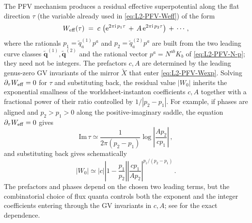 The PFV mechanism produces a residual effective superpotential along
the flat direction $\tau$ (the variable already used in
\eqref{eq:L2-PFV-Weff}) of the form
\begin{equation}\label{eq:racetrack}
    W_{\rm eff}(\tau) \;=\; c\,\left (\mathrm{e}^{2\pi\mathrm{i}\,p_1 \tau}
        \,+\, A\,\mathrm{e}^{2\pi\mathrm{i}\,p_2 \tau}\right )
        \,+\, \cdots \,,
\end{equation}
where the rationals $p_1=\widetilde q^{(1)}_a p^a$ and
$p_2=\widetilde q^{(2)}_a p^a$ are built from the two leading curve
classes $\widetilde{\mathbf q}^{(1)},\widetilde{\mathbf q}^{(2)}$
and the rational vector $p^a=N^{ab}K_b$ of
\eqref{eq:L2-PFV-N-p}; they need not be integers.  The
prefactors $c, A$ are determined by the leading genus-zero
GV invariants of the mirror $\widetilde X$ that enter
\eqref{eq:L2-PFV-Wexp}.  Solving $\partial_{\tau}
W_{\rm eff}=0$ for $\tau$ and substituting back, the
residual value $|W_0|$ inherits the exponential smallness of the
worldsheet-instanton coefficients $c, A$ together with a fractional
power of their ratio controlled by $1/|p_2-p_1|$.
For example, if phases are aligned and
$p_2>p_1>0$ along the positive-imaginary saddle, the equation
$\partial_\tau W_{\rm eff}=0$ gives
\begin{equation}
    \mathrm{Im}\,\tau
    \simeq
    \frac{1}{2\pi(p_2-p_1)}
    \log\left|\frac{A p_2}{c p_1}\right|\, ,
\end{equation}
and substituting back gives schematically
\begin{equation}
    |W_0|
    \simeq
    |c|\left|1-\frac{p_1}{p_2}\right|
    \left|\frac{c p_1}{A p_2}\right|^{p_1/(p_2-p_1)}\, .
\end{equation}
The prefactors and phases depend on the chosen two leading terms,
but the combinatorial choice of flux quanta controls both the
exponent and the integer coefficients entering through the GV
invariants in $c, A$; see \cite{Demirtas:2019sip} for the exact
dependence.

